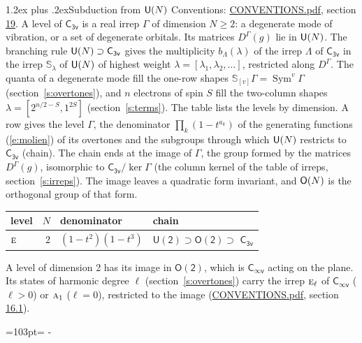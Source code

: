 \documentclass[10pt,a4paper]{article}
\makeatletter
\renewcommand\section{\@startsection{section}{1}{\z@}{-3ex plus -1ex minus -.2ex}%
  {1.2ex plus .2ex}{\normalfont\large\sffamily\bfseries\color{parttitle}}}
\newcommand{\needspace}[1]{\par\penalty-100\begingroup\dimen0=#1\relax\dimen2=\pagegoal
  \advance\dimen2-\pagetotal\ifdim\dimen0>\dimen2\relax\ifdim\dimen2>0pt\vfil\break\fi\fi
  \endgroup}
\numberwithin{equation}{section}
\newcommand{\grp}[1]{\mathsf{#1}}
\newcommand{\irr}[1]{\text{\normalfont\scshape #1}}
\newcommand{\repD}[1]{D^{#1}}
\newcommand{\schur}[1]{\mathbb{S}_{#1}}
\newcommand{\shape}[1]{[#1]}
\makeatother
\begin{document}
\section{Subduction from \texorpdfstring{$\grp{U(\mathnormal{N})}$}{U(N)}}\label{s:unitary}
Conventions: \href{../../CONVENTIONS.pdf}{CONVENTIONS.pdf}, section \href{../../CONVENTIONS.pdf\#conv.19}{19}.
\leavevmode\label{n:local.level.dimension}A level of $\grp{C_{3v}}$ is a real irrep $\Gamma$ of dimension $N \ge 2$: a degenerate mode of vibration, or a set of degenerate orbitals. \label{n:group.unitary}Its matrices $\repD{\Gamma}(g)$ lie in $\grp{U(\mathnormal{N})}$. \label{n:irrep.schur}\label{n:shape.partition}\label{n:local.partition}\label{n:function.multiplicity.unitary}The branching rule $\grp{U(\mathnormal{N})} \supset \grp{C_{3v}}$ gives the multiplicity $b_\Lambda(\lambda)$ of the irrep $\Lambda$ of $\grp{C_{3v}}$ in the irrep $\schur{\lambda}$ of $\grp{U(\mathnormal{N})}$ of highest weight $\lambda = \shape{\lambda_1, \lambda_2, \dots}$, restricted along $\repD{\Gamma}$. \label{n:local.partition.power}\label{n:local.electrons}\label{n:local.spin}The quanta of a degenerate mode fill the one-row shapes $\schur{\shape{v}}\Gamma = \operatorname{Sym}^{v}\Gamma$ (section~\ref{s:overtones}), and $n$ electrons of spin $S$ fill the two-column shapes $\lambda = \shape{2^{n/2-S}, 1^{2S}}$ (section~\ref{s:terms}).
The table lists the levels by dimension. \label{n:head.level}\label{n:head.denominator}\label{n:index.overtone.denominator}\label{n:head.chain}A row gives the level $\Gamma$, the denominator $\prod_k (1 - t^{a_k})$ of the generating functions (\ref{e:molien}) of its overtones and the subgroups through which $\grp{U(\mathnormal{N})}$ restricts to $\grp{C_{3v}}$ (chain). The chain ends at the image of $\Gamma$, the group formed by the matrices $\repD{\Gamma}(g)$, isomorphic to $\grp{C_{3v}}/\ker\Gamma$ (the column kernel of the table of irreps, section~\ref{s:irreps}). The image leaves a quadratic form invariant, and $\grp{O(\mathnormal{N})}$ is the orthogonal group of that form.
{\small\begin{longtable}{@{}lrll@{}}\toprule
level & $N$ & denominator & chain\\\midrule\endhead
\bottomrule\endfoot\endlastfoot
$\irr{e}$ & 2 & $(1-t^{2})(1-t^{3})$ & $\grp{U(2)} \supset \grp{O(2)} \supset$ \href{C3v.pdf}{$\grp{C_{3v}}$}\\
\bottomrule\end{longtable}}
A level of dimension 2 has its image in $\grp{O(2)}$, which is \href{Cinfv.pdf}{$\grp{C_{\infty v}}$} acting on the plane. \label{n:index.harmonic.degree}Its states of harmonic degree $\ell$ (section~\ref{s:overtones}) carry the irrep $\irr{e}_{\ell}$ of \href{Cinfv.pdf}{$\grp{C_{\infty v}}$} ($\ell > 0$) or $\irr{a}_{1}$ ($\ell = 0$), restricted to the image (\href{../../CONVENTIONS.pdf}{CONVENTIONS.pdf}, section \href{../../CONVENTIONS.pdf\#conv.16.1}{16.1}).
\needspace{103pt}
\end{document}

